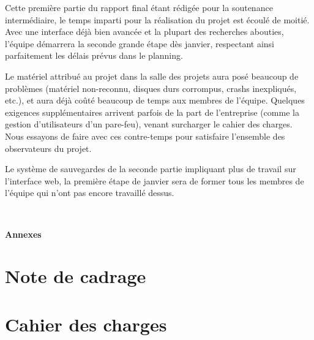 Cette première partie du rapport final étant rédigée pour la soutenance intermédiaire, le temps imparti pour la réalisation du projet est écoulé de moitié. Avec une interface déjà bien avancée et la plupart des recherches abouties, l'équipe démarrera la seconde grande étape dès janvier, respectant ainsi parfaitement les délais prévus dans le planning.

Le matériel attribué au projet dans la salle des projets aura posé beaucoup de problèmes (matériel non-reconnu, disques durs corrompus, crashs inexpliqués, etc.), et aura déjà coûté beaucoup de temps aux membres de l'équipe. Quelques exigences supplémentaires arrivent parfois de la part de l'entreprise (comme la gestion d'utilisateurs d'un pare-feu), venant surcharger le cahier des charges. Nous essayons de faire avec ces contre-temps pour satisfaire l'ensemble des observateurs du projet.

Le système de sauvegardes de la seconde partie impliquant plus de travail sur l'interface web, la première étape de janvier sera de former tous les membres de l'équipe qui n'ont pas encore travaillé dessus.

\newpage
~\vspace{5cm}
\begin{center}
	{\Huge \textbf{Annexes}}
\end{center}
\newpage

\appendix

\section{Note de cadrage}
\label{note-cadrage}


\section{Cahier des charges}
\label{cahier-charges}


